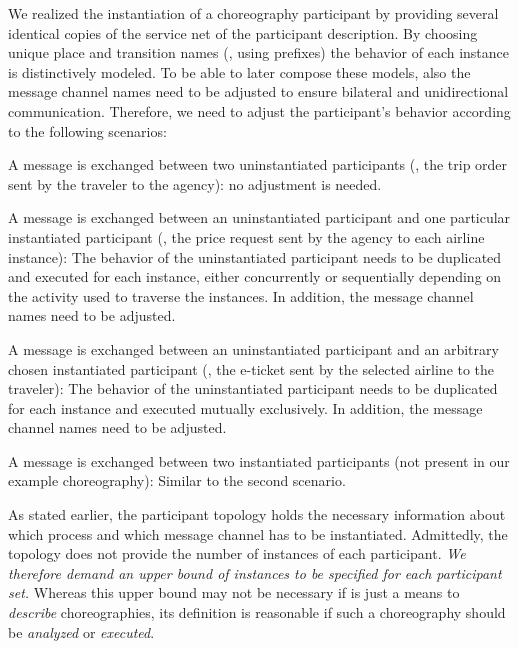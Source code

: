 We realized the instantiation of a choreography participant by providing several identical copies of the service net of the participant description. By choosing unique place and transition names (\eg, using prefixes) the behavior of each instance is distinctively modeled. To be able to later compose these models, also the message channel names need to be adjusted to ensure bilateral and unidirectional communication. Therefore, we need to adjust the participant's behavior according to the following scenarios:

\begin{niceenumerate}
\item A message is exchanged between two uninstantiated participants (\eg, the trip order sent by the traveler to the agency): no adjustment is needed.

\item A message is exchanged between an uninstantiated participant and one particular instantiated participant (\eg, the price request sent by the agency to each airline instance): The behavior of the uninstantiated participant needs to be duplicated and executed for each instance, either concurrently or sequentially depending on the  activity used to traverse the instances. In addition, the message channel names need to be adjusted.

\item A message is exchanged between an uninstantiated participant and an arbitrary chosen instantiated participant (\eg, the e-ticket sent by the selected airline to the traveler): The behavior of the uninstantiated participant needs to be duplicated for each instance and executed mutually exclusively. In addition, the message channel names need to be adjusted.

\item A message is exchanged between two instantiated participants (not pre\-sent in our example choreography): Similar to the second scenario.
\end{niceenumerate}

As stated earlier, the participant topology holds the necessary information about which process and which message channel has to be instantiated. Admittedly, the topology does not provide the number of instances of each participant. \emph{We therefore demand an upper bound of instances to be specified for each participant set.} Whereas this upper bound may not be necessary if \bpelchor{} is just a means to \emph{describe} choreographies, its definition is reasonable if such a choreography should be \emph{analyzed} or \emph{executed}.

